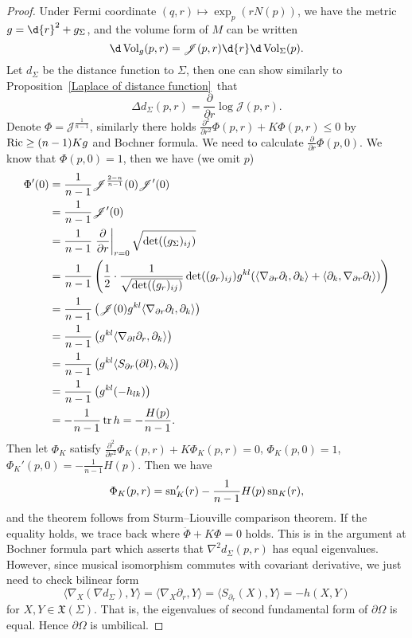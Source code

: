 \begin{proof}
    Under Fermi coordinate $(q,r)\mapsto\exp_p(rN(p))$, we have the metric $g=\d{r}^2+g_{\Sigma}$, and the volume form of $M$ can be written
    \[\d\Vol_g(p,r)=\mathscr{J}(p,r)\d{r}\d\Vol_{\Sigma}(p).\]
    Let $d_\Sigma$ be the distance function to $\Sigma$, then one can show similarly to Proposition~\ref{Laplace of distance function}~that
    \[\Delta d_\Sigma(p,r)=\frac{\partial{}}{\partial{r}}\log\mathscr{J}(p,r).\]
    Denote $\Phi=\mathscr{J}^{\frac{1}{n-1}}$, similarly there holds $\frac{\partial^2{}}{\partial{r^2}}\Phi(p,r)+K\Phi(p,r)\leq 0$ by $\operatorname{Ric}\geq(n-1)Kg$ and Bochner formula.
    We need to calculate $\frac{\partial{}}{\partial{r}}\Phi(p,0)$.
    We know that $\Phi(p,0)=1$, then we have (we omit $p$)
    \begin{align*}
        \Phi'(0)&=\frac{1}{n-1}\mathscr{J}^{\frac{2-n}{n-1}}(0)\mathscr{J}'(0)\\
        &=\frac{1}{n-1}\mathscr{J}'(0)\\
        &=\frac{1}{n-1}\left.\frac{\partial{}}{\partial{r}}\right|_{r=0}\sqrt{\det((g_\Sigma)_{ij})}\\
        &=\frac{1}{n-1}\left(\frac{1}{2}\cdot\frac{1}{\sqrt{\det((g_r)_{ij})}}\det((g_r)_{ij})g^{kl}(\langle\nabla_{\partial r}\partial_l,\partial_k\rangle+\langle\partial_k,\nabla_{\partial r}\partial_l\rangle)\right)\\
        &=\frac{1}{n-1}\left(\mathscr{J}(0)g^{kl}\langle\nabla_{\partial r}\partial_l,\partial_k\rangle\right)\\
        &=\frac{1}{n-1}\left(g^{kl}\langle\nabla_{\partial l}\partial_r,\partial_k\rangle\right)\\
        &=\frac{1}{n-1}\left(g^{kl}\langle S_{\partial r}(\partial l),\partial_k\rangle\right)\\
        &=\frac{1}{n-1}\left(g^{kl}(-h_{lk})\right)\\
        &=-\frac{1}{n-1}\operatorname{tr}{h}=-\frac{H(p)}{n-1}.
    \end{align*}
    Then let $\Phi_K$ satisfy $\frac{\partial^2{}}{\partial{r^2}}\Phi_K(p,r)+K\Phi_K(p,r)=0$, $\Phi_K(p,0)=1$, $\Phi_K'(p,0)=-\frac{1}{n-1}H(p)$.
    Then we have
    \[\Phi_K(p,r)=\operatorname{sn}_K'(r)-\frac{1}{n-1}H(p)\operatorname{sn}_K(r),\]
    and the theorem follows from Sturm--Liouville comparison theorem.
    If the equality holds, we trace back where $\ddot{\Phi}+K\Phi=0$ holds.
    This is in the argument at Bochner formula part which asserts that $\nabla^2d_\Sigma(p,r)$ has equal eigenvalues.
    However, since musical isomorphism commutes with covariant derivative, we just need to check bilinear form
    \[\langle\nabla_X(\nabla d_\Sigma),Y\rangle=\langle\nabla_X\partial_r,Y\rangle=\langle S_{\partial_r}(X),Y\rangle=-h(X,Y)\]
    for $X,Y\in\mathfrak{X}(\Sigma)$.
    That is, the eigenvalues of second fundamental form of $\partial\Omega$ is equal.
    Hence $\partial\Omega$ is umbilical.
\end{proof}

